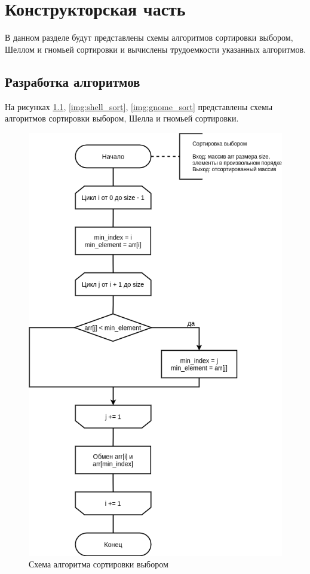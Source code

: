\chapter{Конструкторская часть}

В данном разделе будут представлены схемы алгоритмов сортировки выбором, Шеллом и гномьей сортировки и вычислены трудоемкости указанных алгоритмов.

\section{Разработка алгоритмов}

На рисунках \ref{img:selection_sort}, \ref{img:shell_sort}, \ref{img:gnome_sort} представлены схемы алгоритмов сортировки выбором, Шелла и гномьей сортировки.

\begin{figure}[H]
	\begin{center}
		\includegraphics[scale=0.4]{img/selection_sort.png}
	\end{center}
	\captionsetup{justification=centering}
	\caption{Схема алгоритма сортировки выбором}
	\label{img:selection_sort}
\end{figure}


